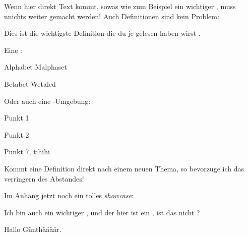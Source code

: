 \documentclass[Zusammenfassung, Vorlesung=ANA1]{Lilly}
\begin{document}
Wenn hier direkt Text kommt, sowas wie zum Beispiel ein wichtiger , muss nnichts weiter gemacht werden!
Auch Definitionen sind kein Problem:
\begin{definition}[Wichtig]
    Dies ist die wichtigste Definition die du je gelesen haben wirst .
\end{definition}
Eine :
\begin{smalldesc}
    \item[Alphabet] Malphaset
    \item[Betabet] Wetaled
\end{smalldesc}
Oder auch eine -Umgebung:
\begin{smalldite}
    \item Punkt 1
    \item Punkt 2
    \item Punkt 7, tihihi
\end{smalldite}
\TOPskip
\begin{definition}[Heyho]
    Kommt eine Definition direkt nach einem neuen Thema, so bevorzuge ich das verringern des Abstandes!
\end{definition}

\startAppendix

Im Anhang jetzt noch ein tolles \emph{showcase}:
\begin{center}
\end{center}
Ich bin auch ein wichtiger , und der hier ist ein , ist das nicht ?

\begin{definition}[Anhangsdefinition]
Hallo Günthäääär.
\end{definition}
\end{document}
